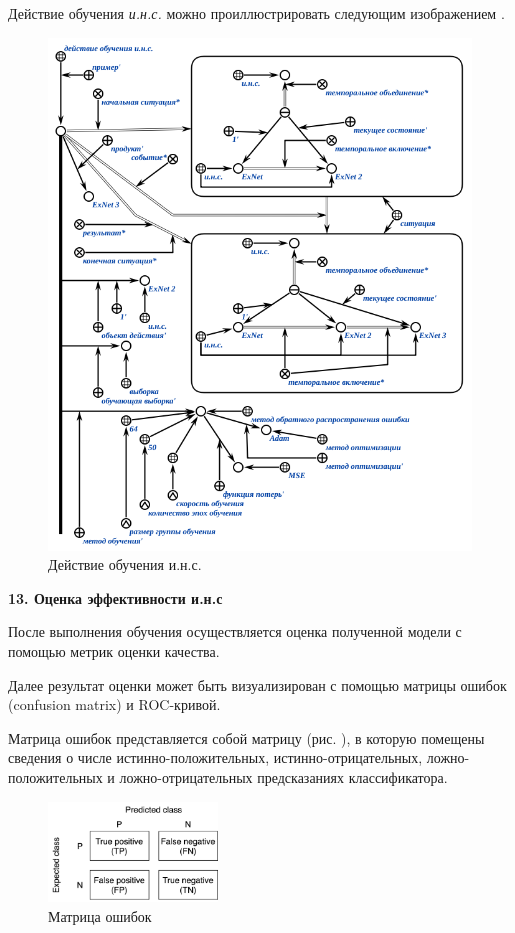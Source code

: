 Действие обучения \textit{и.н.с.} можно проиллюстрировать следующим изображением \textit{}.

\begin{figure}[H]
	\centering
	\includegraphics[scale=0.7]{author/part3/figures/ann_training_nn_scg.png}
	\caption{Действие обучения и.н.с.}
	\label{fig:ann_training_nn_scg}
\end{figure}

\textbf{13. Оценка эффективности и.н.с}

После выполнения обучения осуществляется оценка полученной модели с помощью метрик оценки качества.

Далее результат оценки может быть визуализирован с помощью матрицы ошибок (confusion matrix) и ROC-кривой.

Матрица ошибок представляется собой матрицу (рис. ), в которую помещены сведения о числе истинно-положительных, истинно-отрицательных, ложно-положительных и ложно-отрицательных предсказаниях классификатора.

\begin{figure}[h]
	\centering
	\includegraphics[width=0.4\textwidth]{author/part3/figures/conf_matrix.png}
	\caption{Матрица ошибок}
	\label{fig:conf_matrix}
\end{figure}

